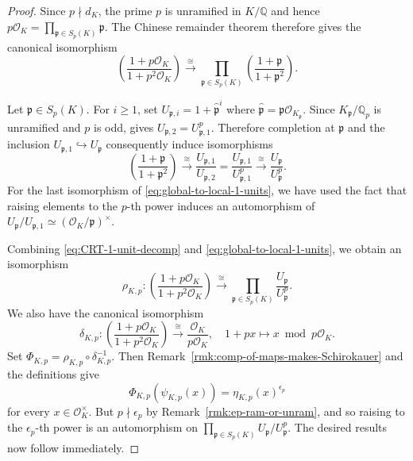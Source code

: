 \documentclass[12pt, a4paper, usenames]{amsart}
\newcommand{\Q}{\mathbb{Q}}
\theoremstyle{plain}
\theoremstyle{remark}
\theoremstyle{definition}
\begin{document}
\begin{proof}
Since $p \nmid d_{K}$, the prime $p$ is unramified in $K/\Q$ and hence
$p\mathcal{O}_{K} = \prod_{\mathfrak{p} \in S_{p}(K)} \mathfrak{p}$.
The Chinese remainder theorem therefore gives the canonical isomorphism
\begin{equation}\label{eq:CRT-1-unit-decomp}
\left( \frac{1+p\mathcal{O}_{K}}{1+p^{2}\mathcal{O}_{K}} \right)
\xrightarrow{\, \cong \, } 
\prod_{\mathfrak{p} \in S_{p}(K)}
\left( \frac{1 + \mathfrak{p}}{1 + \mathfrak{p}^{2}} \right).    
\end{equation}

Let $\mathfrak{p} \in S_{p}(K)$.
For $i \geq 1$, set $U_{\mathfrak{p},i} = 1 + \widehat{\mathfrak{p}}^{i}$ where $\widehat{\mathfrak{p}} = \mathfrak{p}\mathcal{O}_{K_{\mathfrak{p}}}$.
Since $K_{\mathfrak{p}}/\Q_{p}$ is unramified and $p$ is odd, 
\cite[Chapter~XIV, \S 4, Proposition~9]{MR554237} gives
$U_{\mathfrak{p},2} = U_{\mathfrak{p},1}^{p}$.
Therefore completion at $\mathfrak{p}$ and 
the inclusion $U_{\mathfrak{p},1} \hookrightarrow U_{\mathfrak{p}}$ 
consequently induce isomorphisms
\begin{equation}\label{eq:global-to-local-1-units}
\left( \frac{1 + \mathfrak{p}}{1 + \mathfrak{p}^{2}} \right)
\xrightarrow{\, \cong \, } 
\frac{U_{\mathfrak{p},1}}{U_{\mathfrak{p},2}}
=
\frac{U_{\mathfrak{p},1}}{U_{\mathfrak{p},1}^{p}}
\xrightarrow{\, \cong \, } 
\frac{U_{\mathfrak{p}}}{U_{\mathfrak{p}}^{p}}.
\end{equation}
For the last isomorphism of \eqref{eq:global-to-local-1-units}, 
we have used the fact that raising elements to the $p$-th power 
induces an automorphism of $U_{\mathfrak{p}}/U_{\mathfrak{p},1} \simeq (\mathcal{O}_{K}/\mathfrak{p})^{\times}$.

Combining \eqref{eq:CRT-1-unit-decomp} and \eqref{eq:global-to-local-1-units}, 
we obtain an isomorphism 
\[
\rho_{K,p} : 
\left( \frac{1+p\mathcal{O}_{K}}{1+p^{2}\mathcal{O}_{K}} \right)
\xrightarrow{\, \cong \, } 
\prod_{\mathfrak{p} \in S_{p}(K)}
\frac{U_{\mathfrak{p}}}{U_{\mathfrak{p}}^{p}}.
\]
We also have the canonical isomorphism
\[
\delta_{K,p} : 
\left( \frac{1+p\mathcal{O}_{K}}{1+p^{2}\mathcal{O}_{K}} \right)
\xrightarrow{\, \cong \, } 
\frac{\mathcal{O}_{K}}{p\mathcal{O}_{K}}, \quad 1+px \mapsto x \bmod p\mathcal{O}_{K}.
\]
Set $\Phi_{K,p} = \rho_{K,p} \circ \delta_{K,p}^{-1}$.
Then Remark~\ref{rmk:comp-of-maps-makes-Schirokauer} and the definitions give
\[
\Phi_{K,p}(\psi_{K,p}(x)) = \eta_{K,p}(x)^{\epsilon_{p}}
\]
for every $x \in \mathcal{O}_{K}^{\times}$.
But $p \nmid \epsilon_{p}$ by Remark~\ref{rmk:ep-ram-or-unram},
and so raising to the $\epsilon_{p}$-th power is an automorphism on 
$\prod_{\mathfrak{p} \in S_{p}(K)} U_{\mathfrak{p}}/U_{\mathfrak{p}}^{p}$.
The desired results now follow immediately.
\end{proof}
\end{document}
